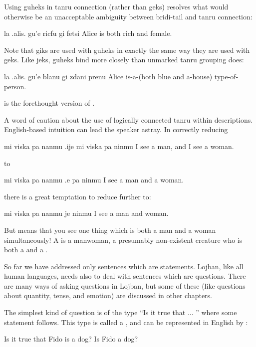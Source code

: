 Using guheks in tanru connection (rather than geks) resolves
    what would otherwise be an unacceptable ambiguity between
    bridi-tail and tanru connection:
\begin{example}
la .alis. gu'e ricfu gi fetsi\n
Alice is both rich and female.
\end{example}

Note that giks are used with guheks in exactly the same way
    they are used with geks. Like jeks, guheks bind more closely
    than unmarked tanru grouping does:
\begin{example}
la .alis. gu'e blanu gi zdani prenu\n
Alice is-a-(both blue and a-house) type-of-person.
\end{example}

{\noindent}is the forethought version of . 

A word of caution about the use of logically connected tanru
    within descriptions. English-based intuition can lead the
    speaker astray. In correctly reducing
\begin{example}
mi viska pa nanmu .ije mi viska pa ninmu\n
I see a man, and I see a woman.
\end{example}

{\noindent}to
\begin{example}
mi viska pa nanmu .e pa ninmu\n
I see a man and a woman.
\end{example}

{\noindent}there is a great temptation to reduce further to:
\begin{example}
mi viska pa nanmu je ninmu\n
I see a man and woman.
\end{example}

But  means that you see
    one thing which is both a man and a woman simultaneously! A
     is a manwoman, a presumably non-existent
    creature who is both a  and a .



So far we have addressed only sentences which are
    statements. Lojban, like all human languages, needs also to
    deal with sentences which are questions. There are many ways of
    asking questions in Lojban, but some of these (like questions
    about quantity, tense, and emotion) are discussed in other
    chapters.

The simplest kind of question is of the type ``Is it true
    that ... '' where some statement follows. This type is called a
    , and can be represented in English by :
\begin{example}
Is it true that Fido is a dog?\n
Is Fido a dog?
\end{example}

